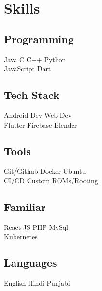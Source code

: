 \documentclass[]{deedy-resume-openfont}
\begin{document}
\begin{minipage}[t]{0.33\textwidth}

\section{Skills}
\subsection{Programming}
\textbullet{} Java \textbullet{}   C \textbullet{} C++ \textbullet{} Python \\ \textbullet{} JavaScript \textbullet{} Dart  \\\sectionsep


\subsection{Tech Stack}
\textbullet{} Android Dev \textbullet{} Web Dev \\ \textbullet{} Flutter \textbullet{} Firebase \textbullet{} Blender \\
\sectionsep


\subsection{Tools}
\textbullet{} Git/Github \textbullet{} Docker \textbullet{} Ubuntu \\ \textbullet{} CI/CD \textbullet{} Custom ROMs/Rooting \\
\sectionsep

\subsection{Familiar}
\textbullet{} React JS \textbullet{} PHP \textbullet{} MySql \\ \textbullet{} Kubernetes
\sectionsep


\subsection{Languages}
\textbullet{} English \textbullet{} Hindi \textbullet{} Punjabi
\sectionsep

%
%

\end{minipage} 
\end{document}
